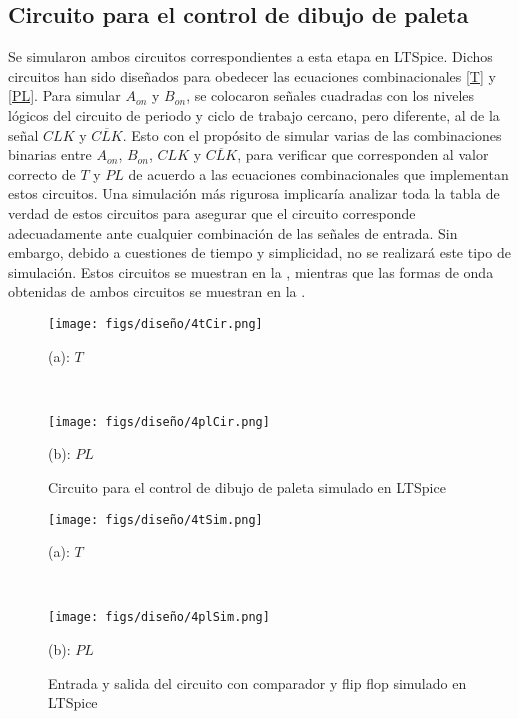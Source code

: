 \subsection{Circuito para el control de dibujo de paleta}
Se simularon ambos circuitos correspondientes a esta etapa en LTSpice.
Dichos circuitos han sido diseñados para obedecer las ecuaciones combinacionales \eqref{T} y \eqref{PL}.
Para simular $A_{on}$ y $B_{on}$, se colocaron señales cuadradas con los niveles lógicos del circuito de periodo y ciclo de trabajo cercano, pero diferente, al de la señal $CLK$ y $\overline{CLK}$.
Esto con el propósito de simular varias de las combinaciones binarias entre $A_{on}$, $B_{on}$, $CLK$ y $\overline{CLK}$, para verificar que corresponden al valor correcto de $T$ y $PL$ de acuerdo a las ecuaciones combinacionales que implementan estos circuitos.
Una simulación más rigurosa implicaría analizar toda la tabla de verdad de estos circuitos para asegurar que el circuito corresponde adecuadamente ante cualquier combinación de las señales de entrada.
Sin embargo, debido a cuestiones de tiempo y simplicidad, no se realizará este tipo de simulación. 
Estos circuitos se muestran en la , mientras que las formas de onda obtenidas de ambos circuitos se muestran en la .

\begin{figure}[H]
    \centering
    \begin{minipage}{0.6\linewidth}
        \centering
        \texttt{[image: figs/diseño/4tCir.png]}
        \caption*{(a): $T$}
    \end{minipage}\\
    \begin{minipage}{0.6\linewidth}
        \centering
        \texttt{[image: figs/diseño/4plCir.png]}
        \caption*{(b): $PL$}
    \end{minipage}
    \caption{Circuito para el control de dibujo de paleta simulado en LTSpice}
    \label{controlDibujoCir}
\end{figure}

\newpage
\begin{figure}[H]
    \centering
    \begin{minipage}{0.75\linewidth}
        \centering
        \texttt{[image: figs/diseño/4tSim.png]}
        \caption*{(a): $T$}
    \end{minipage}\\
    \begin{minipage}{0.75\linewidth}
        \centering
        \texttt{[image: figs/diseño/4plSim.png]}
        \caption*{(b): $PL$}
    \end{minipage}
    \caption{Entrada y salida del circuito con comparador y flip flop simulado en LTSpice}
    \label{controlDibujoSim}
\end{figure}

